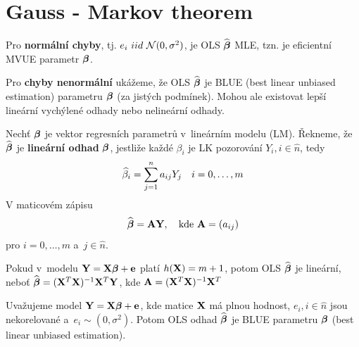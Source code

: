 \section{Gauss - Markov theorem}
Pro \textbf{normální chyby}, tj. $e_i~iid~\mathcal{N}(0,\sigma^2)$, je OLS $\widehat{\boldsymbol{\beta}}$ MLE, tzn. je eficientní MVUE parametr $\boldsymbol{\beta}$.

Pro \textbf{chyby nenormální} ukážeme, že OLS $\widehat{\boldsymbol{\beta}}$ je BLUE (best linear unbiased estimation) parametru $\boldsymbol{\beta}$ (za jistých podmínek). Mohou ale existovat lepší lineární vychýlené odhady nebo nelineární odhady.

\begin{define}
	Nechť $\boldsymbol{\beta}$ je vektor regresních parametrů v~lineárním modelu (LM). Řekneme, že $\widehat{\boldsymbol{\beta}}$ je \textbf{lineární odhad} $\boldsymbol{\beta}$, jestliže každé $\beta_i$ je LK pozorování $Y_i, i\in\widehat{n} $, tedy
	 $$
		\widehat{\beta}_i = \sum\limits_{j=1}^{n} a_{ij} Y_j \quad i = 0,\dots,m
	 $$
V maticovém zápisu
	 $$
		\widehat{\boldsymbol{\beta}} = \textbf{A} \mathbf{Y}, \quad \text{kde } \textbf{A} = (a_{ij})
	 $$
pro $i = 0,\dots, m$ a~$j  \in\widehat{n} $.
\end{define}
\begin{remark}
 Pokud v~modelu $\mathbf{Y} = \mathbf{X} \boldsymbol{\beta} + \mathbf{e}$ platí $h(\mathbf{X}) = m+1$, potom OLS $\widehat{\boldsymbol{\beta}}$ je lineární, neboť $\widehat{\boldsymbol{\beta}} = (\mathbf{X}^T \mathbf{X})^{-1} \mathbf{X}^T \mathbf{Y}$, kde $\textbf{A} = (\mathbf{X}^T \mathbf{X})^{-1} \mathbf{X}^T$
\end{remark}
\begin{theorem}
	Uvažujeme model $\mathbf{Y} = \mathbf{X} \boldsymbol{\beta} + \mathbf{e}$, kde matice $\mathbf{X}$ má plnou hodnost, $e_i, i\in\widehat{n} $ jsou nekorelované a~$e_i \sim (0, \sigma^2)$. Potom OLS odhad $\widehat{\boldsymbol{\beta}}$ je BLUE parametru $\boldsymbol{\beta}$ (best linear unbiased estimation).
\end{theorem}
